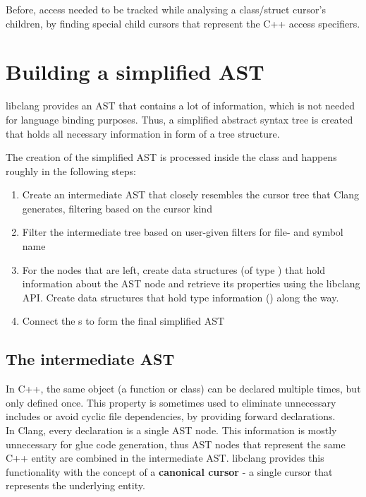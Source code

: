 Before, access needed to be tracked while analysing a class/struct cursor's children, by finding special child cursors that represent the C++ access specifiers.

\section{Building a simplified AST}

libclang provides an AST that contains a lot of information, which is not needed for language binding purposes. Thus, a simplified abstract syntax tree is created that holds all necessary information in form of a tree structure.

The creation of the simplified AST is processed inside the  class and happens roughly in the following steps:

\begin{enumerate}\addtolength{\itemsep}{-0.5\baselineskip}
\item Create an intermediate AST that closely resembles the cursor tree that Clang generates, filtering based on the cursor kind
\item Filter the intermediate tree based on user-given filters for file- and symbol name
\item For the nodes that are left, create data structures (of type ) that hold information about the AST node and retrieve its properties using the libclang API. Create data structures that hold type information () along the way.
\item Connect the s to form the final simplified AST 
\end{enumerate}

\subsection{The intermediate AST}

In C++, the same object (a function or class) can be declared multiple times, but only defined once. This property is sometimes used to eliminate unnecessary includes or avoid cyclic file dependencies, by providing forward declarations.\\
In Clang, every declaration is a single AST node. This information is mostly unnecessary for glue code generation, thus AST nodes that represent the same C++ entity are combined in the intermediate AST. libclang provides this functionality with the concept of a \textbf{canonical cursor} - a single cursor that represents the underlying entity.

